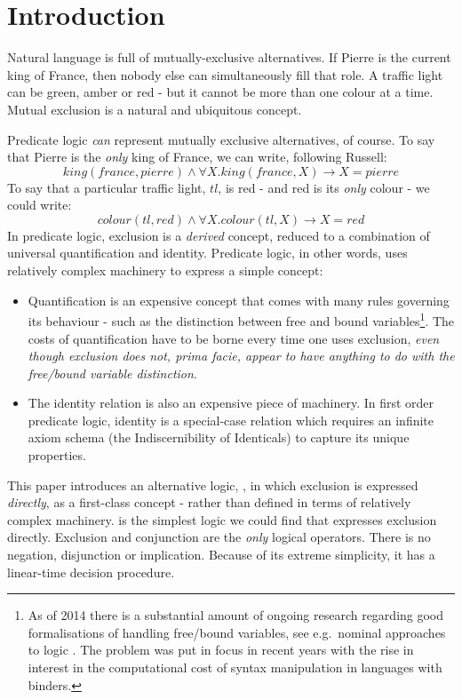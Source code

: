 \section{Introduction}\label{introduction}

Natural language is full of mutually-exclusive alternatives.
If Pierre is the current king of France, then nobody else can simultaneously fill that role.
A traffic light can be green, amber or red - but it cannot be more than one colour at a time.
Mutual exclusion is a natural and ubiquitous concept.

Predicate logic \emph{can} represent mutually exclusive alternatives, of course.
To say that Pierre is the \emph{only} king of France, we can write, following Russell:
\[
king(france, pierre) \land \forall X . king(france, X) \rightarrow X = pierre
\]
To say that a particular traffic light, $tl$, is red - and red is its \emph{only} colour - we could write:
\[
colour(tl, red) \land \forall X . colour(tl, X) \rightarrow X = red
\]
In predicate logic, exclusion is a \emph{derived} concept, reduced to a combination of universal quantification and identity.
Predicate logic, in other words, uses relatively complex machinery to express a simple concept:
\begin{itemize}
\item Quantification is an expensive concept that comes with
      many rules governing its behaviour - such as the distinction
      between free and bound variables\footnote{As of 2014 there is a substantial amount
      of ongoing research regarding good formalisations of handling
      free/bound variables, see e.g.~nominal approaches to
      logic \cite{PittsAM:newaas,PittsAM:nomsetnasics}. The problem
      was put in focus in recent years with the rise in interest in the
      computational cost of syntax manipulation in languages with
      binders.}. The costs of quantification have to be
      borne every time one uses exclusion, \emph{even though exclusion does
      not, prima facie, appear to have anything to do with the
      free/bound variable distinction}.
\item The identity relation is also an expensive piece of machinery. In first order predicate logic, identity is a special-case relation which requires an infinite axiom schema (the Indiscernibility of Identicals) to capture its unique properties.
\end{itemize}

This paper introduces an alternative logic, \ELFULL{}, in which exclusion is expressed \emph{directly}, as a first-class concept - rather than defined in terms of relatively complex machinery.
\ELFULL{} is the simplest logic we could find that expresses exclusion directly. 
Exclusion and conjunction are the \emph{only} logical operators. 
There is no negation, disjunction or implication.
Because of its extreme simplicity, it has a linear-time decision procedure.


